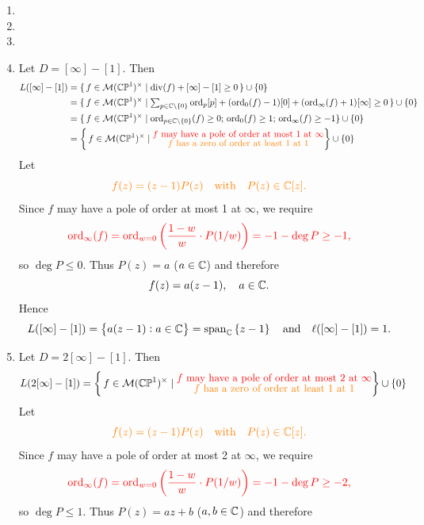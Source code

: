 \documentclass[11pt,openany]{article}
\newcommand{\ord}{\operatorname{ord}}
\begin{document}
\begin{example}
\begin{enumerate}[(1)]
\[	\] Hence
	\[
	L([0]+[\infty])=\set{az+b+c/z:a,b,c\in\C}=\operatorname{span}\left\{1,z,\frac1z\right\}
	\quad\text{and}\quad
	\ell([0]+[\infty])=3.
	\]
	\item[]
	\item[]
	\item[]
	\item {\color{blue} Let $D=[\infty]-[1]$.} Then
	\begin{align*}
		L([\infty]-[1])&=\{\,f\in\mathcal M(\mathbb{CP}^1)^\times\mid \operatorname{div}(f)+[\infty]-[1]\ge 0\,\}\cup\{0\}\\
		&=\{\,f\in\mathcal M(\mathbb{CP}^1)^\times\mid \textstyle\sum_{p\in\C\setminus\{0\}}\ord_p[p]+(\ord_0(f)-1)[0]+(\ord_\infty(f)+1)[\infty]\ge 0\,\}\cup\{0\}\\
		&=\{\,f\in\mathcal M(\mathbb{CP}^1)^\times\mid \ord_{p\in\C\setminus\{0\}}(f)\geq 0;\,\ord_0(f)\geq 1; \,\ord_{\infty}(f)\geq -1\}\cup\{0\} \\
		&=\set{\,f\in\mathcal M(\mathbb{CP}^1)^\times\mid \substack{\text{\normalsize\color{red} $f$ may have a pole of order at most $1$ at $\infty$}\\ \text{\normalsize\color{orange} $f$ has a zero of order at least $1$ at $1$}}}\cup\{0\}
	\end{align*}
	Let \[
	\color{orange} f(z)=(z-1)P(z)\quad\text{with}\quad P(z)\in\mathbb{C}[z].
	\]
	Since $f$ may have a pole of order at most 1 at $\infty$, we require \[
	\color{red}\ord_{\infty}(f)=\ord_{w=0}\left(\frac{1-w}{w}\cdot P(1/w)\right)=-1-\deg P\ge -1,
	\] so $\deg P\leq 0$. Thus $P(z)=a$ ($a\in\mathbb{C}$)
	and therefore \[
	f(z)=a(z-1),\quad a\in\mathbb{C}.
	\] Hence \[
	L([\infty]-[1])=\set{a(z-1):a\in\mathbb{C}}=\operatorname{span}_{\mathbb{C}}\left\{z-1\right\}
	\quad\text{and}\quad
	\ell([\infty]-[1])=1.
	\]
	\item {\color{blue} Let $D=2[\infty]-[1]$.} Then
	\begin{align*}
		L(2[\infty]-[1])&=\set{\,f\in\mathcal M(\mathbb{CP}^1)^\times\mid \substack{\text{\normalsize\color{red} $f$ may have a pole of order at most $2$ at $\infty$}\\ \text{\normalsize\color{orange} $f$ has a zero of order at least $1$ at $1$}}}\cup\{0\}
	\end{align*}
	Let \[
	\color{orange} f(z)=(z-1)P(z)\quad\text{with}\quad P(z)\in\mathbb{C}[z].
	\]
	Since $f$ may have a pole of order at most 2 at $\infty$, we require \[
	\color{red}\ord_{\infty}(f)=\ord_{w=0}\left(\frac{1-w}{w}\cdot P(1/w)\right)=-1-\deg P\ge -2,
	\] so $\deg P\leq 1$. Thus $P(z)=az+b$ ($a,b\in\mathbb{C}$)
	and therefore \[
\]
\end{enumerate}
\end{example}
\end{document}
